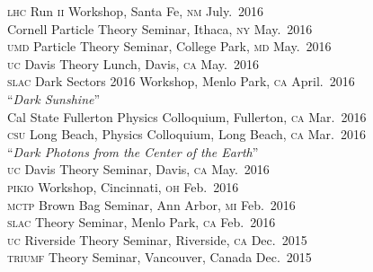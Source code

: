 \documentclass[margin,line]{resume}
\newcommand{\mytalksep}{-.1mm}
\newcommand{\mytalkskip}{2mm}
\newcommand{\scap}[1]{\textsc{\MakeLowercase{#1}}}
\begin{document}
\begin{resume}
%
\scap{LHC} Run \scap{II} Workshop, 
Santa Fe, \scap{NM}
\hfill %
July.~2016\vspace{\mytalksep}\\ 
%
Cornell Particle Theory Seminar, 
Ithaca, \scap{NY}
\hfill %
May.~2016\vspace{\mytalksep}\\ 
%
\scap{UMD} Particle Theory Seminar, 
College Park, \scap{MD}
\hfill %
May.~2016\vspace{\mytalksep}\\ 
%
\scap{UC} Davis
Theory Lunch, Davis, \scap{CA}
\hfill %
May.~2016\vspace{\mytalksep}\\ 
%
\scap{SLAC} 
Dark Sectors 2016 Workshop, Menlo Park, \scap{CA}
\hfill %
April.~2016\vspace{\mytalkskip}\\   
%
%
%
%
``\emph{Dark Sunshine}''
\vspace{\mytalksep}\\ 
Cal State Fullerton
Physics Colloquium, Fullerton, \scap{CA}
\hfill %
Mar.~2016\vspace{\mytalksep}\\   
%
\scap{CSU} Long Beach,
Physics Colloquium,
Long Beach, \scap{CA}
\hfill %
Mar.~2016\vspace{\mytalkskip}\\
%
%
%
%
``\emph{Dark Photons from the Center of the Earth}''
\vspace{\mytalksep}\\ 
\scap{UC} Davis
Theory Seminar, Davis, \scap{CA}
\hfill %
May.~2016\vspace{\mytalksep}\\ 
%
\scap{PIKIO} 
Workshop, Cincinnati, \scap{OH}
\hfill %
Feb.~2016\vspace{\mytalksep}\\   
%
\scap{MCTP} 
Brown Bag Seminar, Ann Arbor, \scap{MI}
\hfill %
Feb.~2016\vspace{\mytalksep}\\   
%
\scap{SLAC} 
Theory Seminar, Menlo Park, \scap{CA}
\hfill %
Feb.~2016\vspace{\mytalksep}\\   
%
\scap{UC} Riverside
Theory Seminar, Riverside, \scap{CA}
\hfill %
Dec.~2015\vspace{\mytalksep}\\   
%
\scap{TRIUMF}
Theory Seminar, Vancouver, Canada
\hfill %
Dec.~2015\vspace{\mytalksep}\\   

\end{resume}
\end{document}
